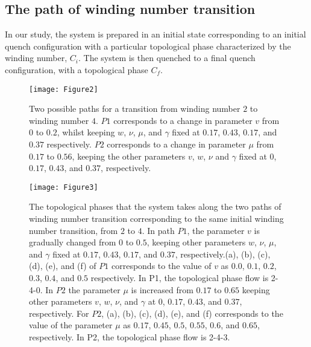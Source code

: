 \documentclass[aps,pra,reprint,superscriptaddress,longbibliography]{revtex4-2}
\begin{document}
\subsection{The path of winding number transition}
In our study, the system is prepared in an initial state corresponding to an initial quench configuration with a particular topological phase characterized by the winding number, $C_i$. The system is then quenched to a final quench configuration, with a topological phase $C_f$. 
\begin{figure}
	\centering
	\texttt{[image: Figure2]}
	\caption{Two possible paths for a transition from winding number $2$ to winding number $4$. $P1$ corresponds to a change in parameter $v$ from $0$ to $0.2$, whilst keeping $w$, $\nu$, $\mu$, and $\gamma$ fixed at $0.17$, $0.43$, $0.17$, and $0.37$ respectively. $P2$ corresponds to a change in parameter $\mu$ from $0.17$ to $0.56$, keeping the other parameters $v$, $w$, $\nu$ and $\gamma$ fixed at $0$, $0.17$, $0.43$, and $0.37$, respectively.}
	\label{fig:figure2}
		\vspace{-0.5cm}
\end{figure}

\begin{figure*}
	\centering
	\texttt{[image: Figure3]}
	\caption{ The topological phases that the system takes along the two paths of winding number transition corresponding to the same initial winding number transition, from $2$ to $4$. In path $P1$, the parameter $v$ is gradually changed from $0$ to $0.5$, keeping other parameters $w$, $\nu$, $\mu$, and $\gamma$ fixed at $0.17$, $0.43$, $0.17$, and $0.37$, respectively.(a), (b), (c), (d), (e), and (f) of $P1$ corresponds to the value of $v$ as $0.0$, $0.1$, $0.2$, $0.3$, $0.4$, and $0.5$ respectively. In P1, the topological phase flow is 2-4-0. In $P2$ the parameter $\mu$ is increased from $0.17$ to $0.65$ keeping other parameters $v$, $w$, $ \nu$, and $\gamma$ at $0$, $0.17$, $0.43$, and $0.37$, respectively. For $P2$, (a), (b), (c), (d), (e), and (f) corresponds to the value of the parameter $\mu$ as $0.17$, $0.45$, $0.5$, $0.55$, $0.6$, and $0.65$, respectively. In P2, the topological phase flow is 2-4-3.}
	\label{fig:figure3}
	\vspace{-0.5cm}
\end{figure*}
\end{document}
